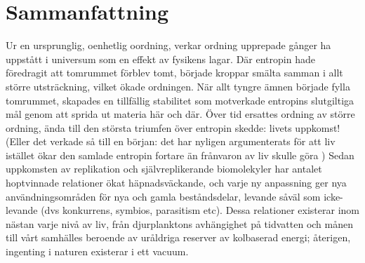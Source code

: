 


\chapter{Sammanfattning}
Ur en ursprunglig, oenhetlig oordning, verkar ordning upprepade gånger ha uppstått i universum som en effekt av fysikens lagar. Där entropin hade föredragit att tomrummet förblev tomt, började kroppar smälta samman i allt större utsträckning, vilket ökade ordningen. När allt tyngre ämnen började fylla tomrummet, skapades en tillfällig stabilitet som motverkade entropins slutgiltiga mål genom att sprida ut materia här och där. Över tid ersattes ordning av större ordning, ända till den största triumfen över entropin skedde: livets uppkomst! (Eller det verkade så till en början: det har nyligen argumenterats för att liv istället ökar den samlade entropin fortare än frånvaron av liv skulle göra \citep{england2013statistical}) Sedan uppkomsten av replikation och självreplikerande biomolekyler har antalet hoptvinnade relationer ökat häpnadsväckande, och varje ny anpassning ger nya användningsområden för nya och gamla beståndsdelar, levande såväl som icke-levande (dvs konkurrens, symbios, parasitism etc). Dessa relationer existerar inom nästan varje nivå av liv, från djurplanktons avhängighet på tidvatten och månen till vårt samhälles beroende av uråldriga reserver av kolbaserad energi; återigen, ingenting i naturen existerar i ett vacuum.


